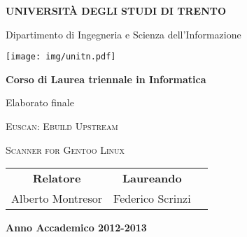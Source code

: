 \begin{titlepage}
  \pagestyle{empty}

  \begin{center}
    {\bfseries
      \Large {\huge U}NIVERSIT\`A DEGLI {\huge S}TUDI DI {\huge T}RENTO}

    \vspace{0.2cm}

    {\Large Dipartimento di Ingegneria e Scienza dell'Informazione}

    \vspace{0.5cm}

    \begin{center}
      \texttt{[image: img/unitn.pdf]}
    \end{center}

    \vspace{0.5cm}

    {\bfseries \Large Corso di Laurea triennale in Informatica}

    \vspace{0.3cm}

    {\Large Elaborato finale}

    \vspace{2.5cm}

    {\huge \textsc{Euscan: Ebuild Upstream}\\}

    \vspace{0.2cm}

    {\huge \textsc{Scanner for Gentoo Linux}}

    \vspace{3.0cm}


    \large
    \begin{center}
      \begin{tabular}{ccc}
        {\bfseries Relatore} &
        \hspace{5cm}
        {\bfseries Laureando} \\

        Alberto Montresor &
        \hspace{5cm} Federico Scrinzi \\


      \end{tabular}
    \end{center}
    \vspace{3cm}

    {\bfseries \large Anno Accademico 2012-2013}
    \vfill
  \end{center}
\end{titlepage}